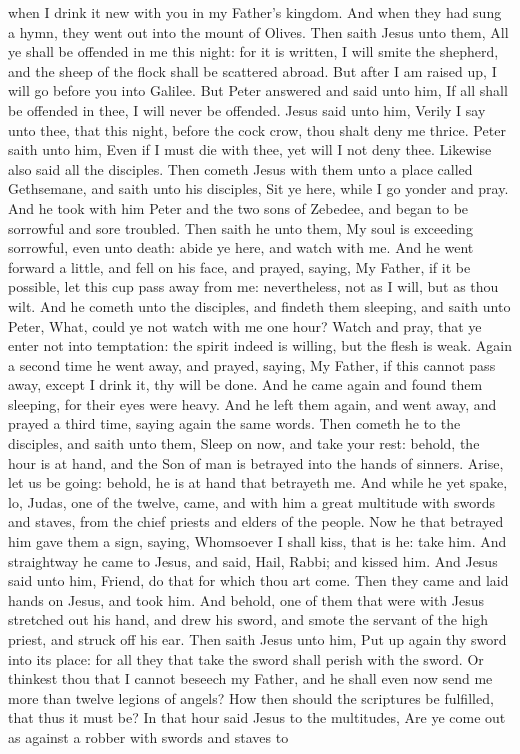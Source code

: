 when I drink it new with you in my Father’s kingdom.  And when they had sung a hymn, they went out into the mount of Olives.  Then saith Jesus unto them, All ye shall be offended in me this night: for it is written, I will smite the shepherd, and the sheep of the flock shall be scattered abroad. But after I am raised up, I will go before you into Galilee. But Peter answered and said unto him, If all shall be offended in thee, I will never be offended. Jesus said unto him, Verily I say unto thee, that this night, before the cock crow, thou shalt deny me thrice. Peter saith unto him, Even if I must die with thee, yet will I not deny thee. Likewise also said all the disciples.  Then cometh Jesus with them unto a place called Gethsemane, and saith unto his disciples, Sit ye here, while I go yonder and pray. And he took with him Peter and the two sons of Zebedee, and began to be sorrowful and sore troubled. Then saith he unto them, My soul is exceeding sorrowful, even unto death: abide ye here, and watch with me. And he went forward a little, and fell on his face, and prayed, saying, My Father, if it be possible, let this cup pass away from me: nevertheless, not as I will, but as thou wilt. And he cometh unto the disciples, and findeth them sleeping, and saith unto Peter, What, could ye not watch with me one hour? Watch and pray, that ye enter not into temptation: the spirit indeed is willing, but the flesh is weak. Again a second time he went away, and prayed, saying, My Father, if this cannot pass away, except I drink it, thy will be done. And he came again and found them sleeping, for their eyes were heavy. And he left them again, and went away, and prayed a third time, saying again the same words. Then cometh he to the disciples, and saith unto them, Sleep on now, and take your rest: behold, the hour is at hand, and the Son of man is betrayed into the hands of sinners. Arise, let us be going: behold, he is at hand that betrayeth me.  And while he yet spake, lo, Judas, one of the twelve, came, and with him a great multitude with swords and staves, from the chief priests and elders of the people. Now he that betrayed him gave them a sign, saying, Whomsoever I shall kiss, that is he: take him. And straightway he came to Jesus, and said, Hail, Rabbi; and kissed him. And Jesus said unto him, Friend, do that for which thou art come. Then they came and laid hands on Jesus, and took him. And behold, one of them that were with Jesus stretched out his hand, and drew his sword, and smote the servant of the high priest, and struck off his ear. Then saith Jesus unto him, Put up again thy sword into its place: for all they that take the sword shall perish with the sword. Or thinkest thou that I cannot beseech my Father, and he shall even now send me more than twelve legions of angels? How then should the scriptures be fulfilled, that thus it must be? In that hour said Jesus to the multitudes, Are ye come out as against a robber with swords and staves to 